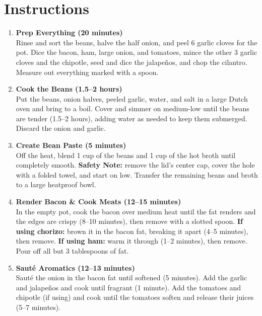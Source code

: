\newpage
{}
\section*{Instructions}

\begin{enumerate}

      \item \textbf{Prep Everything (20 minutes)} \\
            Rinse and sort the beans, halve the half onion, and peel 6 garlic cloves for the pot. Dice the bacon, ham, large onion, and tomatoes, mince the other 3 garlic cloves and the chipotle, seed and dice the jalapeños, and chop the cilantro. Measure out everything marked with a spoon.

      \item \textbf{Cook the Beans (1.5--2 hours)} \\
            Put the beans, onion halves, peeled garlic, water, and salt in a large Dutch oven and bring to a boil. Cover and simmer on medium-low until the beans are tender (1.5--2 hours), adding water as needed to keep them submerged. Discard the onion and garlic.

      \item \textbf{Create Bean Paste (5 minutes)} \\
            Off the heat, blend 1 cup of the beans and 1 cup of the hot broth until completely smooth. \textbf{Safety Note:} remove the lid's center cap, cover the hole with a folded towel, and start on low. Transfer the remaining beans and broth to a large heatproof bowl.

      \item \textbf{Render Bacon \& Cook Meats (12--15 minutes)} \\
            In the empty pot, cook the bacon over medium heat until the fat renders and the edges are crispy (8--10 minutes), then remove with a slotted spoon. \textbf{If using chorizo:} brown it in the bacon fat, breaking it apart (4--5 minutes), then remove. \textbf{If using ham:} warm it through (1--2 minutes), then remove. Pour off all but 3 tablespoons of fat.

      \item \textbf{Sauté Aromatics (12--13 minutes)} \\
            Sauté the onion in the bacon fat until softened (5 minutes). Add the garlic and jalapeños and cook until fragrant (1 minute). Add the tomatoes and chipotle (if using) and cook until the tomatoes soften and release their juices (5--7 minutes).


\end{enumerate}
